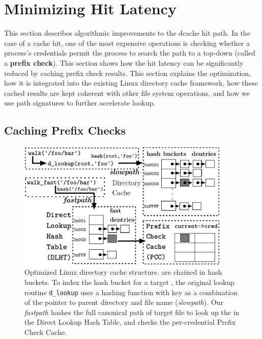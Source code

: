 \section{Minimizing Hit Latency}
\label{sec:dcache}

This section describes
algorithmic improvements to the dcache hit path.  
In the case of a cache hit, one of the most expensive operations
is checking whether 
a process's credentials permit the process to search
the path to a \dentry{} top-down (called a {\bf prefix check}).
This section shows how the hit latency can be significantly reduced
by caching prefix check results.
This section explains the optimization, how it is integrated into the existing Linux directory cache 
framework, how these cached results are kept coherent with other file system operations,
and how we use path signatures to further accelerate lookup.



\subsection{Caching Prefix Checks}
\label{sec:dcache:prefixcheck}

\begin{figure}[t!]
\centering
\includegraphics[width=4in]{dcache/figures/dcache-structure.pdf}
\footnotesize
\caption[Optimized Linux directory cache structure.]
{Optimized Linux directory cache structure. \dentries{} are chained in hash buckets. To index the hash bucket for a target \dentry{}, the original lookup routine {\tt d\_lookup} uses a hashing function with key as a combination of the pointer to parent directory and file name ({\em slowpath}).
Our {\em fastpath} hashes the full canonical path of target file to look up the \dentry{}
in the Direct Lookup Hash Table,
and checks the per-credential Prefix Check Cache.}
\label{fig:dcache}
\end{figure}

